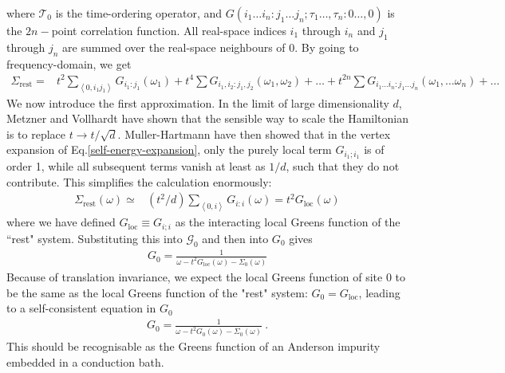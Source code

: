 \documentclass[12pt,onecolumn]{revtex4-2}
\begin{document}
where \(\mathcal{T}_0\) is the time-ordering operator, and \(G\left(i_1\ldots i_n:j_1\ldots j_n;\tau_1\ldots,\tau_n:0\ldots,0\right)\) is the \(2n-\)point correlation function. All real-space indices \(i_1\) through \(i_n\) and \(j_1\) through \(j_n\) are summed over the real-space neighbours of \(0\). By going to frequency-domain, we get
\begin{equation}\begin{aligned}
	\Sigma_\text{rest} =& t^2 \sum_{\left<0,i_1 j_1 \right>} G_{i_1:j_1}(\omega_1) + t^4 \sum G_{i_1,i_2:j_1,j_2}(\omega_1,\omega_2) + \ldots + t^{2n} \sum G_{i_1\ldots i_n:j_1\ldots j_n}(\omega_1,\ldots \omega_n) + \ldots\label{self-energy-expansion}
\end{aligned}\end{equation}
We now introduce the first approximation. In the limit of large dimensionality \(d\), Metzner and Vollhardt have shown that the sensible way to scale the Hamiltonian is to replace \(t \to t/\sqrt{d}\). Muller-Hartmann have then showed that in the vertex expansion of Eq.\ref{self-energy-expansion}, only the purely local term \(G_{i_1;i_1}\) is of order 1, while all subsequent terms vanish at least as \(1/d\), such that they do not contribute. This simplifies the calculation enormously:
\begin{equation}\begin{aligned}
	\Sigma_\text{rest}(\omega) \simeq& \left(t^2/d\right) \sum_{\left<0,i\right>} G_{i:i}(\omega) = t^2 G_\text{loc}(\omega)
\end{aligned}\end{equation}
where we have defined \(G_\text{loc} \equiv G_{i;i}\) as the interacting local Greens function of the ``rest" system. Substituting this into \(\mathcal{G}_0\) and then into \(G_0\) gives
\begin{equation}\begin{aligned}
	G_0 = \frac{1}{\omega - t^2 G_\text{loc}(\omega) - \Sigma_0(\omega)}
\end{aligned}\end{equation}
Because of translation invariance, we expect the local Greens function of site 0 to be the same as the local Greens function of the "rest" system: \(G_0 = G_\text{loc}\), leading to a self-consistent equation in \(G_0\)
\begin{equation}\begin{aligned}
	G_0 = \frac{1}{\omega - t^2 G_0(\omega) - \Sigma_0(\omega)}~.
\end{aligned}\end{equation}
This should be recognisable as the Greens function of an Anderson impurity embedded in a conduction bath.
\end{document}

